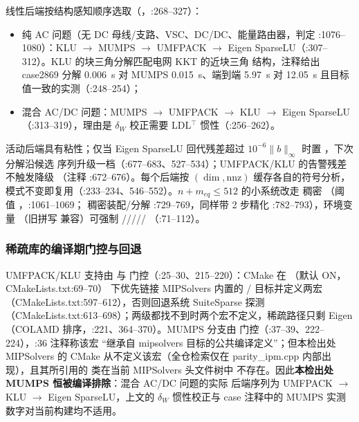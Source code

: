 线性后端按结构感知顺序选取（，:268--327）：
\begin{itemize}
  \item 纯 AC 问题（无 DC 母线/支路、VSC、DC/DC、能量路由器，判定
        :1076--1080）：KLU $\to$ MUMPS $\to$ UMFPACK $\to$ Eigen
        SparseLU（:307--312）。KLU 的块三角分解匹配电网 KKT 的近块三角
        结构，注释给出 case2869 分解 0.006~s 对 MUMPS 0.015~s、端到端
        5.97~s 对 12.05~s 且目标值一致的实测（:248--254）；
  \item 混合 AC/DC 问题：MUMPS $\to$ UMFPACK $\to$ KLU $\to$ Eigen
        SparseLU（:313--319），理由是 $\delta_W$ 校正需要 LDL$^{\top}$
        惯性（:256--262）。
\end{itemize}
活动后端具有粘性；仅当 Eigen SparseLU 回代残差超过
$10^{-6}\lVert b\rVert_\infty$ 时置 ，下次分解沿候选
序列升级一档（:677--683、527--534）；UMFPACK/KLU 的告警残差不触发降级
（注释 :672--676）。每个后端按 $(\dim,\mathrm{nnz})$ 缓存各自的符号分析，
模式不变即复用（:233--234、546--552）。$n+m_{eq}\le512$ 的小系统改走
稠密 （阈值 ，:1061--1069；
稠密装配/分解 :729--769，同样带 2 步精化 :782--793），环境变量
（旧拼写
 兼容）可强制
/////
（:71--112）。

\subsubsection*{稀疏库的编译期门控与回退}
UMFPACK/KLU 支持由  与
 门控（:25--30、215--220）：CMake 在
（默认 ON，CMakeLists.txt:69--70）
下优先链接 MIPSolvers 内置的 /
目标并定义两宏（CMakeLists.txt:597--612），否则回退系统 SuiteSparse 探测
（CMakeLists.txt:613--698）；两级都找不到时两个宏不定义，稀疏路径只剩
Eigen （COLAMD 排序，:221、364--370）。MUMPS 分支由
 门控（:37--39、222--224），:36 注释称该宏
“继承自 mipsolvers 目标的公共编译定义”；但本检出处 MIPSolvers 的 CMake
从不定义该宏（全仓检索仅在 parity\_ipm.cpp 内部出现），且其所引用的
 类在当前 MIPSolvers 头文件树中
不存在。因此\textbf{本检出处 MUMPS 恒被编译排除}：混合 AC/DC 问题的实际
后端序列为 UMFPACK $\to$ KLU $\to$ Eigen SparseLU，上文的 $\delta_W$
惯性校正与 case 注释中的 MUMPS 实测数字对当前构建均不适用。

